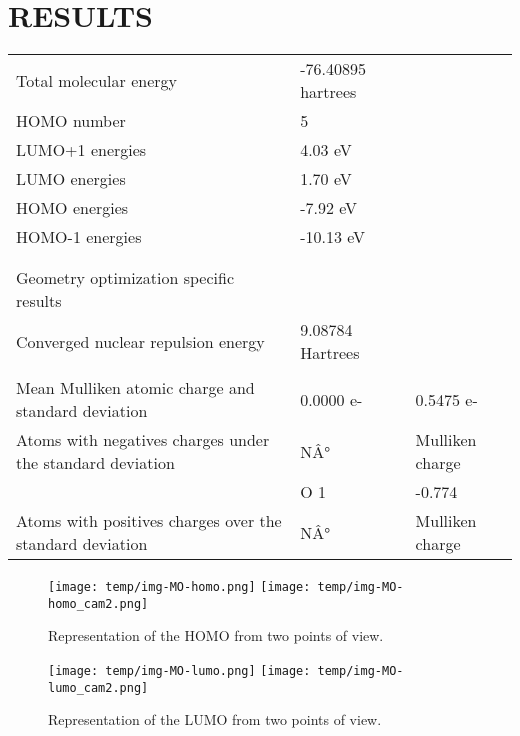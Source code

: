 \documentclass{article}%
\begin{document}
%
\section{RESULTS}%
\label{sec:RESULTS}%
\begin{tabularx}{\textwidth}{|l X| X|}%
Total molecular energy&{-}76.40895 hartrees& \\%
HOMO number&5& \\%
LUMO+1 energies&4.03 eV& \\%
LUMO   energies&1.70 eV& \\%
HOMO   energies&{-}7.92 eV& \\%
HOMO{-}1 energies&{-}10.13 eV& \\%
 & & \\%
 & & \\%
Geometry optimization specific results& & \\%
Converged nuclear repulsion energy&9.08784 Hartrees& \\%
 & & \\%
Mean Mulliken atomic charge and standard deviation&0.0000 e{-}&0.5475 e{-}\\%
Atoms with negatives charges under the standard deviation&NÂ°&Mulliken charge\\%
 &O 1&  {-}0.774\\%
Atoms with positives charges over the standard deviation&NÂ°&Mulliken charge\\%
\end{tabularx}%
\begin{figure}[h]%
\begin{center}%
\texttt{[image: temp/img-MO-homo.png]}%
\texttt{[image: temp/img-MO-homo\_cam2.png]}%
\end{center}%
\vspace{-5mm}%
\caption{Representation of the HOMO from two points of view.}%
\end{figure}%
\begin{figure}[h]%
\begin{center}%
\texttt{[image: temp/img-MO-lumo.png]}%
\texttt{[image: temp/img-MO-lumo\_cam2.png]}%
\end{center}%
\vspace{-5mm}%
\caption{Representation of the LUMO from two points of view.}%
\end{figure}%
\end{document}
